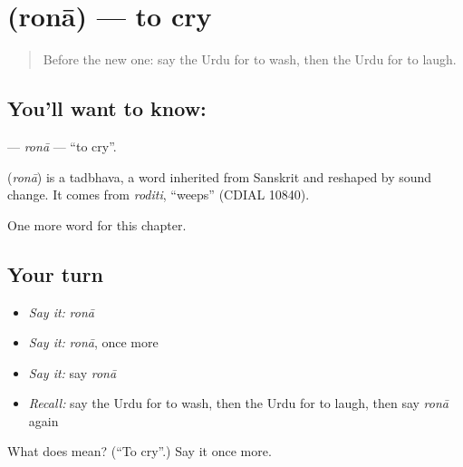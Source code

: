 \section[\texorpdfstring{\ur{رونا} (ronā)}{رونا (ronā)}]{ (ronā) — to cry}

\label{lesson:UR-C49-rona}



\begin{quote}
Before the new one: say the Urdu for to wash, then the Urdu for to laugh.
\end{quote}

\subsection*{You'll want to know: }
\textbf{} — \emph{ronā} — \textquotedblleft{}to cry\textquotedblright{}.

\begin{cousinweb}
\textbf{} (\emph{ronā}) is a tadbhava, a word inherited from Sanskrit and reshaped by sound change. It comes from \emph{roditi}, \textquotedblleft{}weeps\textquotedblright{} (CDIAL 10840).
\end{cousinweb}

\begin{grammarlens}[title={What you've built}]
One more word for this chapter.
\end{grammarlens}

\subsection*{Your turn}
\begin{itemize}
\raggedright
  \item \emph{Say it:} \emph{ronā}
  \item \emph{Say it:} \emph{ronā}, once more
  \item \emph{Say it:} say \emph{ronā}
  \item \emph{Recall:} say the Urdu for to wash, then the Urdu for to laugh, then say \emph{ronā} again
\end{itemize}

\begin{tcolorbox}[breakable,colback=teal!4,colframe=teal!35!black,title={Before you move on}]
What does  mean? (\textquotedblleft{}To cry\textquotedblright{}.) Say it once more.
\end{tcolorbox}
